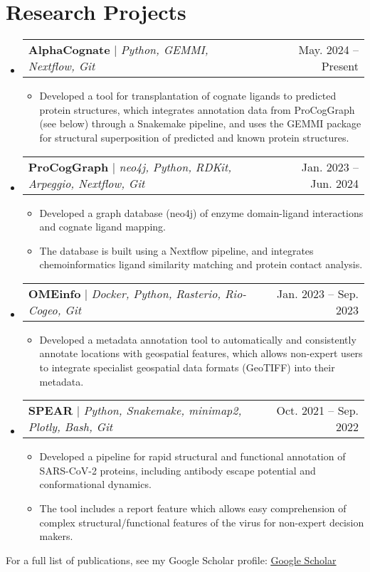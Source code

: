 \documentclass[a4paper,11pt]{article}
\makeatletter
\newcommand{\resumeItem}[1]{
  \item\small{
    {#1 \vspace{-2pt}}
  }
}
\newcommand{\resumeProjectHeading}[2]{
    \item
    \begin{tabular*}{0.97\textwidth}{l@{\extracolsep{\fill}}r}
      \small#1 & #2 \\
    \end{tabular*}\vspace{-7pt}
}
\newcommand{\resumeSubHeadingListStart}{\begin{itemize}[leftmargin=0.15in, label={}]}
\newcommand{\resumeSubHeadingListEnd}{\end{itemize}}
\newcommand{\resumeItemListStart}{\begin{itemize}}
\newcommand{\resumeItemListEnd}{\end{itemize}\vspace{-5pt}}
\makeatother
\begin{document}
\section{Research Projects}
    \resumeSubHeadingListStart
      \resumeProjectHeading
        {\textbf{AlphaCognate} $|$ \emph{Python, GEMMI, Nextflow, Git}}{May. 2024 -- Present}
        \resumeItemListStart
          \resumeItem{Developed a tool for transplantation of cognate ligands to predicted protein structures, which integrates annotation data from ProCogGraph (see below) through a Snakemake pipeline, and uses the GEMMI package for structural superposition of predicted and known protein structures.}
        \resumeItemListEnd
      \resumeProjectHeading
          {\textbf{ProCogGraph} $|$ \emph{neo4j, Python, RDKit, Arpeggio, Nextflow, Git}}{Jan. 2023 -- Jun. 2024}
          \resumeItemListStart
            \resumeItem{Developed a graph database (neo4j) of enzyme domain-ligand interactions and cognate ligand mapping.}
            \resumeItem{The database is built using a Nextflow pipeline, and integrates chemoinformatics ligand similarity matching and protein contact analysis.}
          \resumeItemListEnd
      \resumeProjectHeading
          {\textbf{OMEinfo} $|$ \emph{Docker, Python, Rasterio, Rio-Cogeo, Git}}{Jan. 2023 -- Sep. 2023}
          \resumeItemListStart
            \resumeItem{Developed a metadata annotation tool to automatically and consistently annotate locations with geospatial features, which allows non-expert users to integrate specialist geospatial data formats (GeoTIFF) into their metadata.}
          \resumeItemListEnd
      \resumeProjectHeading
          {\textbf{SPEAR} $|$ \emph{Python, Snakemake, minimap2, Plotly, Bash, Git}}{Oct. 2021 -- Sep. 2022}
          \resumeItemListStart
            \resumeItem{Developed a pipeline for rapid structural and functional annotation of SARS-CoV-2 proteins, including antibody escape potential and conformational dynamics.}
            \resumeItem{The tool includes a report feature which allows easy comprehension of complex structural/functional features of the virus for non-expert decision makers.}
          \resumeItemListEnd
    \resumeSubHeadingListEnd
For a full list of publications, see my Google Scholar profile: \href{https://scholar.google.com/citations?user=b8OKEYcAAAAJ&hl=en&oi=ao}{\underline{Google Scholar}}


%
\end{document}
